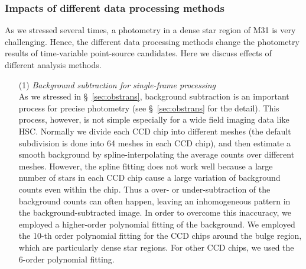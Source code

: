 \documentclass[iop, apj]{emulateapj}
\newcommand{\?}{\stackrel{?}{=}}
\begin{document}
\subsubsection{Impacts of different data processing methods}
\label{sec:methtest}
As we stressed several times, a photometry in a dense star region of M31 is very challenging. Hence, the different data processing methods change the photometry results of time-variable point-source candidates. Here we discuss effects of different analysis methods. 

\begin{itemize}
\item[(1)]{\it Background subtraction for single-frame processing}\\
\label{sec:back6d}
As we stressed in \S~\ref{sec:obstrans}, 
background subtraction is an important process for precise photometry (see \S~\ref{sec:obstrans} for the detail). 
This process, however, is not simple especially for a wide field imaging data like HSC. Normally we divide each CCD chip into different meshes (the default subdivision is done into 64 meshes in each CCD chip), and then estimate a smooth background by spline-interpolating the average counts over different meshes. However, the spline fitting does not work well because a large number of stars in each CCD chip cause a large variation of background counts even within the chip. Thus a over- or under-subtraction of the background counts can often happen, leaving an inhomogeneous pattern in the background-subtracted image. %
In order to overcome this inaccuracy, we employed a higher-order polynomial fitting of the background. We employed the 10-th order polynomial fitting for the CCD chips around the bulge region, which are particularly dense star regions. For other CCD chips, we used the 6-order polynomial fitting. 


\end{itemize}
\end{document}

